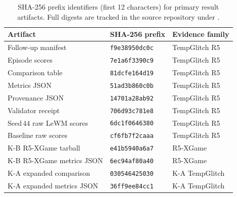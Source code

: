 \begin{table}[t]
\caption{SHA-256 prefix identifiers (first 12 characters) for primary result artifacts.
Full digests are tracked in the source repository under .}
\label{tab:artifact-hashes}
\centering
\small
\begin{tabularx}{\textwidth}{@{}lll@{}}
\toprule
Artifact & SHA-256 prefix & Evidence family \\
\midrule
Follow-up manifest       & \texttt{f9e38950dc0c} & TempGlitch R5 \\
Episode scores           & \texttt{7e1a6f3390c9} & TempGlitch R5 \\
Comparison table         & \texttt{81dcfe164d19} & TempGlitch R5 \\
Metrics JSON             & \texttt{51ad3b860c0b} & TempGlitch R5 \\
Provenance JSON          & \texttt{14701a28ab92} & TempGlitch R5 \\
Validator receipt        & \texttt{706d93c781e8} & TempGlitch R5 \\
Seed\,44 raw LeWM scores & \texttt{6dc1f0646380} & TempGlitch R5 \\
Baseline raw scores      & \texttt{cf6fb7f2caaa} & TempGlitch R5 \\
K-B R5-XGame tarball     & \texttt{e41b5940a6a7} & R5-XGame \\
K-B R5-XGame metrics JSON & \texttt{6ec94af80a40} & R5-XGame \\
K-A expanded comparison  & \texttt{030546425030} & K-A TempGlitch \\
K-A expanded metrics JSON & \texttt{36ff9ee84cc1} & K-A TempGlitch \\
\bottomrule
\end{tabularx}
\end{table}
